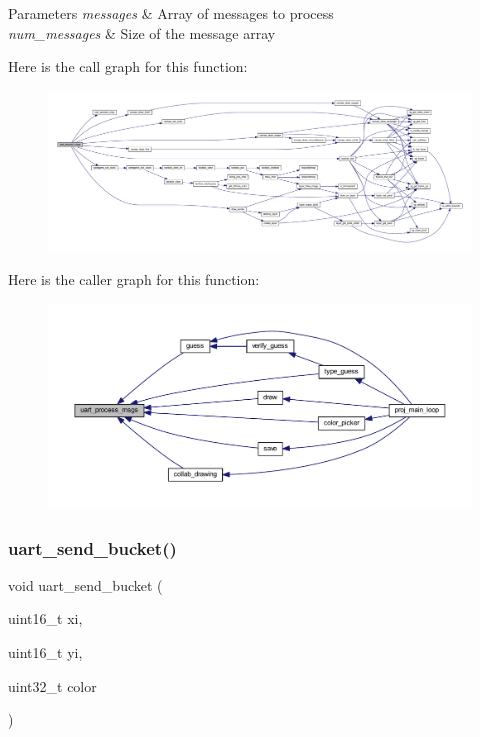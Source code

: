 \begin{DoxyParams}{Parameters}
{\em messages} & Array of messages to process \\
\hline
{\em num\+\_\+messages} & Size of the message array \\
\hline
\end{DoxyParams}
Here is the call graph for this function\+:\nopagebreak
\begin{figure}[H]
\begin{center}
\leavevmode
\includegraphics[width=350pt]{group__uart__wordgame_ga1dbbd888f62428123dfc5bbbfa178134_cgraph}
\end{center}
\end{figure}
Here is the caller graph for this function\+:\nopagebreak
\begin{figure}[H]
\begin{center}
\leavevmode
\includegraphics[width=350pt]{group__uart__wordgame_ga1dbbd888f62428123dfc5bbbfa178134_icgraph}
\end{center}
\end{figure}
\mbox{\label{group__uart__wordgame_ga83e5f9cd1712f2eec7dbdca9704004a5}} 
\subsubsection{\texorpdfstring{uart\+\_\+send\+\_\+bucket()}{uart\_send\_bucket()}}
{\footnotesize\ttfamily void uart\+\_\+send\+\_\+bucket (\begin{DoxyParamCaption}\item[{uint16\+\_\+t}]{xi,  }\item[{uint16\+\_\+t}]{yi,  }\item[{uint32\+\_\+t}]{color }\end{DoxyParamCaption})}



